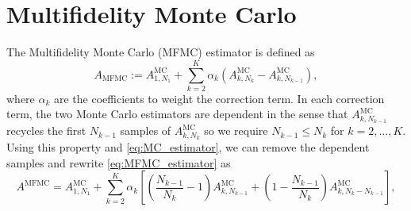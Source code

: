 \documentclass[final,3p,times,11pt]{elsarticle}
\begin{document}
\section{Multifidelity Monte Carlo}
The Multifidelity Monte Carlo (MFMC) estimator is defined as
\begin{equation}\label{eq:MFMC_estimator}
    A_{\text{MFMC}} := A^{\text{MC}}_{1,N_1} + \sum_{k=2}^K \alpha_k\left(A^{\text{MC}}_{k,N_k} - A^{\text{MC}}_{k,N_{k-1}} \right),
\end{equation}
where $\alpha_k$ are the coefficients to weight the correction term. In each correction term, the two Monte Carlo estimators are dependent in the sense that $A^{\text{MC}}_{k,N_{k-1}}$ recycles the first $N_{k-1}$ samples of $A^{\text{MC}}_{k,N_{k}}$ so we require $N_{k-1}\le N_k$ for $k=2,\ldots,K$. Using this property and \eqref{eq:MC_estimator}, we can remove the dependent samples and rewrite \eqref{eq:MFMC_estimator} as
\begin{equation}\label{eq:MFMC_estimator_independent}
    A^{\text{MFMC}} = A^{\text{MC}}_{1,N_1} +  \sum_{k=2}^K \alpha_k\left[\left(\frac{N_{k-1}}{N_{k}}-1\right)A_{k,N_{k-1}}^{\text{MC}}+\left(1-\frac{N_{k-1}}{N_{k}}\right) A_{k,N_k-N_{k-1}}^{\text{MC}}\right],
\end{equation}
\end{document}
